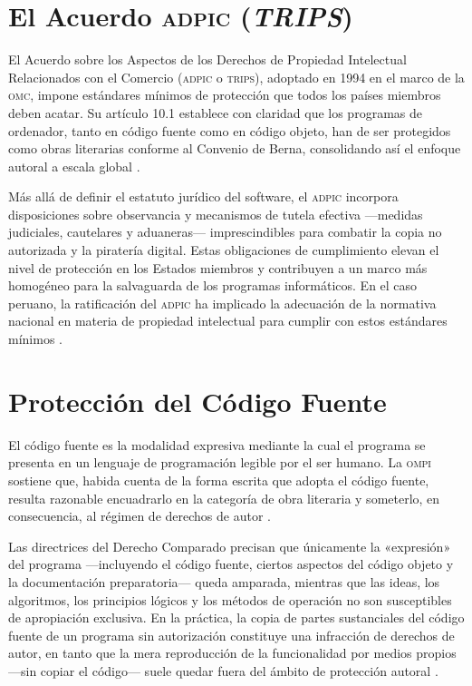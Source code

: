 \documentclass[11pt,a4paper]{report}
\begin{document}
\section{El Acuerdo \textsc{adpic} (\textit{TRIPS})}

El Acuerdo sobre los Aspectos de los Derechos de Propiedad Intelectual Relacionados con el Comercio (\textsc{adpic} o \textsc{trips}), adoptado en 1994 en el marco de la \textsc{omc}, impone estándares mínimos de protección que todos los países miembros deben acatar. Su artículo 10.1 establece con claridad que los programas de ordenador, tanto en código fuente como en código objeto, han de ser protegidos como obras literarias conforme al Convenio de Berna, consolidando así el enfoque autoral a escala global \citep{omc1994}.

Más allá de definir el estatuto jurídico del software, el \textsc{adpic} incorpora disposiciones sobre observancia y mecanismos de tutela efectiva —medidas judiciales, cautelares y aduaneras— imprescindibles para combatir la copia no autorizada y la piratería digital. Estas obligaciones de cumplimiento elevan el nivel de protección en los Estados miembros y contribuyen a un marco más homogéneo para la salvaguarda de los programas informáticos. En el caso peruano, la ratificación del \textsc{adpic} ha implicado la adecuación de la normativa nacional en materia de propiedad intelectual para cumplir con estos estándares mínimos \citep{indecopi2023}.

\section{Protección del Código Fuente}

El código fuente es la modalidad expresiva mediante la cual el programa se presenta en un lenguaje de programación legible por el ser humano. La \textsc{ompi} sostiene que, habida cuenta de la forma escrita que adopta el código fuente, resulta razonable encuadrarlo en la categoría de obra literaria y someterlo, en consecuencia, al régimen de derechos de autor \citep{ompi2024}.

Las directrices del Derecho Comparado precisan que únicamente la «expresión» del programa —incluyendo el código fuente, ciertos aspectos del código objeto y la documentación preparatoria— queda amparada, mientras que las ideas, los algoritmos, los principios lógicos y los métodos de operación no son susceptibles de apropiación exclusiva. En la práctica, la copia de partes sustanciales del código fuente de un programa sin autorización constituye una infracción de derechos de autor, en tanto que la mera reproducción de la funcionalidad por medios propios —sin copiar el código— suele quedar fuera del ámbito de protección autoral \citep{ompi2024, euipo2022}.
\end{document}
